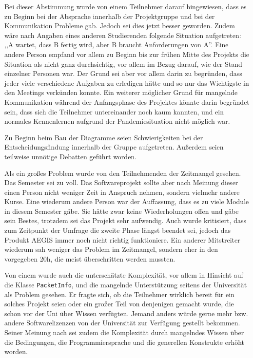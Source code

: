 \documentclass[../review_3.tex]{subfiles}
\begin{document}
Bei dieser Abstimmung wurde von einem Teilnehmer darauf hingewiesen, dass es zu Beginn bei der Absprache innerhalb der Projektgruppe und bei der Kommunikation Probleme gab. Jedoch sei dies jetzt besser geworden. Zudem wäre nach Angaben eines anderen Studierenden folgende Situation aufgetreten: ,,A wartet, dass B fertig wird, aber B braucht Anforderungen von A''. Eine andere Person empfand vor allem zu Beginn bis zur frühen Mitte des Projekts die Situation als nicht ganz durchsichtig, vor allem im Bezug darauf, wie der Stand einzelner Personen war. Der Grund sei aber vor allem darin zu begründen, dass jeder viele verschiedene Aufgaben zu erledigen hätte und so nur das Wichtigste in den Meetings verkünden konnte. Ein weiterer möglicher Grund für mangelnde Kommunikation während der Anfangsphase des Projektes könnte darin begründet sein, dass sich die Teilnehmer untereinander noch kaum kannten, und ein normales Kennenlernen aufgrund der Pandemiesituation nicht möglich war.

Zu Beginn beim Bau der Diagramme seien Schwierigkeiten bei der Entscheidungsfindung innerhalb der Gruppe aufgetreten. Außerdem seien teilweise unnötige Debatten geführt worden.

Als ein großes Problem wurde von den Teilnehmenden der Zeitmangel gesehen. Das Semester sei zu voll. Das Softwareprojekt sollte aber nach Meinung dieser einen Person nicht weniger Zeit in Anspruch nehmen, sondern vielmehr andere Kurse. Eine wiederum andere Person war der Auffassung, dass es zu viele Module in diesem Semester gäbe. Sie hätte zwar keine Wiederholungen offen und gäbe sein Bestes, trotzdem sei das Projekt sehr aufwendig. Auch wurde kritisiert, dass zum Zeitpunkt der Umfrage die zweite Phase längst beendet sei, jedoch das Produkt AEGIS immer noch nicht richtig funktioniere. Ein anderer Mitstreiter wiederum sah weniger das Problem im Zeitmangel, sondern eher in den vorgegeben 20h, die meist überschritten werden mussten.

Von einem wurde auch die unterschätzte Komplexität, vor allem in Hinsicht auf die Klasse \texttt{PacketInfo}, und die mangelnde Unterstützung seitens der Universität als Problem gesehen. Er fragte sich, ob die Teilnehmer wirklich bereit für ein solches Projekt seien oder ein großer Teil von denjenigen gemacht wurde, die schon vor der Uni über Wissen verfügten. Jemand anders würde gerne mehr bzw. andere Softwarelizenzen von der Universität zur Verfügung gestellt bekommen. Seiner Meinung nach sei zudem die Komplexität durch mangelndes Wissen über die Bedingungen, die Programmiersprache und die generellen Konstrukte erhöht worden.
\end{document}
